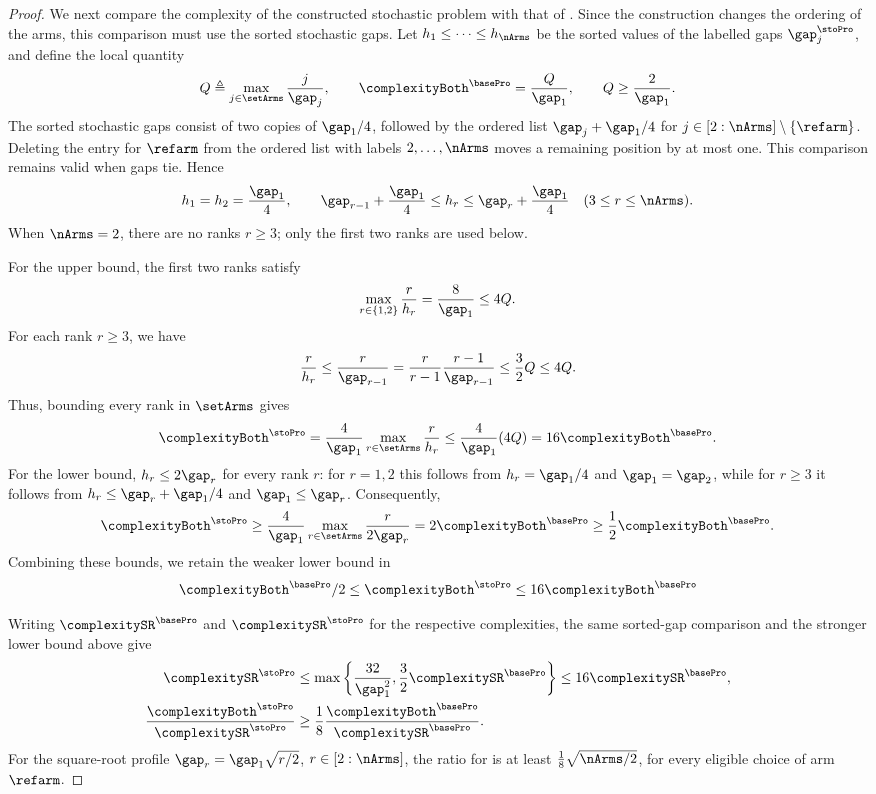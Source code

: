\begin{proof}
We next compare the complexity of the constructed stochastic problem
with that of \basePro{}. Since the construction changes the ordering
of the arms, this comparison must use the sorted stochastic gaps.
Let $h_1\leq\cdots\leq h_\nArms$ be the sorted values of the labelled
gaps $\gap_j^{\stoPro}$, and define the local quantity
\[
Q\triangleq\max_{j\in\setArms}\frac{j}{\gap_j},
\qquad \complexityBoth^{\basePro}=\frac{Q}{\gap_1},
\qquad Q\geq\frac{2}{\gap_1}.
\]
The sorted stochastic gaps consist of two copies of $\gap_1/4$,
followed by the ordered list $\gap_j+\gap_1/4$ for
$j\in[2:\nArms]\setminus\{\refarm\}$.
Deleting the entry for $\refarm$ from the ordered list with labels
$2,\ldots,\nArms$ moves a remaining position by at most one.
This comparison remains valid when gaps tie. Hence
\[
h_1=h_2=\frac{\gap_1}{4},
\qquad
\gap_{r-1}+\frac{\gap_1}{4}\leq h_r
\leq\gap_r+\frac{\gap_1}{4}
\quad(3\leq r\leq\nArms).
\]
When $\nArms=2$, there are no ranks $r\geq3$; only the first two
ranks are used below.

For the upper bound, the first two ranks satisfy
\[
\max_{r\in\{1,2\}}\frac{r}{h_r}
=\frac{8}{\gap_1}\leq4Q.
\]
For each rank $r\geq3$, we have
\[
\frac{r}{h_r}\leq\frac{r}{\gap_{r-1}}
=\frac{r}{r-1}\frac{r-1}{\gap_{r-1}}
\leq\frac32Q\leq4Q.
\]
Thus, bounding every rank in $\setArms$ gives
\[
\complexityBoth^{\stoPro}
=\frac{4}{\gap_1}\max_{r\in\setArms}\frac{r}{h_r}
\leq\frac{4}{\gap_1}(4Q)
=16\complexityBoth^{\basePro}.
\]
For the lower bound, $h_r\leq2\gap_r$ for every rank $r$:
for $r=1,2$ this follows from $h_r=\gap_1/4$ and
$\gap_1=\gap_2$, while for $r\geq3$ it follows from
$h_r\leq\gap_r+\gap_1/4$ and $\gap_1\leq\gap_r$.
Consequently,
\[
\complexityBoth^{\stoPro}
\geq\frac{4}{\gap_1}\max_{r\in\setArms}\frac{r}{2\gap_r}
=2\complexityBoth^{\basePro}
\geq\frac12\complexityBoth^{\basePro}.
\]
Combining these bounds, we retain the weaker lower bound in
\begin{equation}\label{eq:newHBOBSTO}
  \complexityBoth^{\basePro} /2
	\leq
        \complexityBoth^{\stoPro} 
		\leq
 16 \complexityBoth^{\basePro} 
\end{equation}

Writing $\complexitySR^{\basePro}$ and $\complexitySR^{\stoPro}$
for the respective \SR{} complexities, the same sorted-gap comparison
and the stronger lower bound above give
\[
\begin{aligned}
\complexitySR^{\stoPro}
&\leq\max\left\{\frac{32}{\gap_1^2},
\frac32\complexitySR^{\basePro}\right\}
\leq16\complexitySR^{\basePro},\\
\frac{\complexityBoth^{\stoPro}}{\complexitySR^{\stoPro}}
&\geq\frac18\frac{\complexityBoth^{\basePro}}{\complexitySR^{\basePro}}.
\end{aligned}
\]
For the square-root profile $\gap_r=\gap_1\sqrt{r/2}$,
$r\in[2:\nArms]$, the ratio for \stoPro{} is at least
$\frac18\sqrt{\nArms/2}$, for every eligible choice of arm~$\refarm$.


\end{proof}
